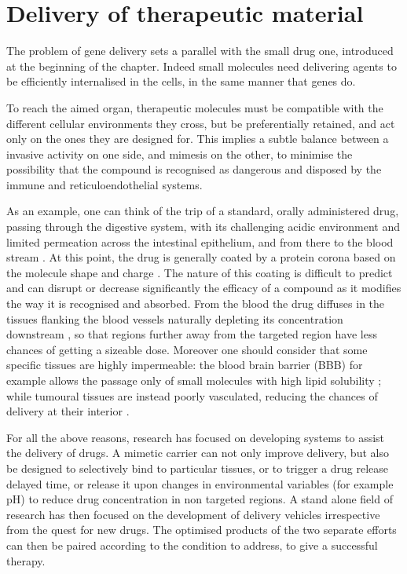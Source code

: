 \section{Delivery of therapeutic material}
The problem of gene delivery sets a parallel with the small drug one, introduced at the beginning of the chapter. Indeed small molecules need delivering agents to be efficiently internalised in the cells, in the same manner that genes do.

To reach the aimed organ, therapeutic molecules must be compatible with the different cellular environments they cross, but be preferentially retained, and act only on the ones they are designed for. This implies a subtle balance between a invasive activity on one side, and mimesis on the other, to minimise the possibility that the compound is recognised as dangerous and disposed by the immune and reticuloendothelial systems.

As an example, one can think of the trip of a standard, orally administered drug, passing through the digestive system, with its challenging acidic environment and limited permeation across the intestinal epithelium, and from there to the blood stream \cite{Masaoka2006, Mitragotri2014}. 
%
At this point, the drug is generally coated by a protein corona based on the molecule shape and charge \cite{Krol2012}. The nature of this coating is difficult to predict and can disrupt or decrease significantly the efficacy of a compound as it modifies the way it is recognised and absorbed.
%
From the blood the drug diffuses in the tissues flanking the blood vessels naturally depleting its concentration downstream \cite{Krol2012}, so that regions further away from the targeted region have less chances of getting a sizeable dose. 
%
Moreover one should consider that some specific tissues are highly impermeable: the blood brain barrier (BBB) for example allows the passage only of small molecules with high lipid solubility \cite{Pattni2015, Krol2012}; while tumoural tissues are instead poorly vasculated, reducing the chances of delivery at their interior \cite{Pattni2015}.

For all the above reasons, research has focused on developing systems to assist the delivery of drugs. A mimetic carrier can not only improve delivery, but also be designed to selectively bind to particular tissues, or to trigger a drug release delayed time, or release it upon changes in environmental variables (for example pH) to reduce drug concentration in non targeted regions. A stand alone field of research has then focused on the development of delivery vehicles irrespective from the quest for new drugs. The optimised products of the two separate efforts can then be paired according to the condition to address, to give a successful therapy.

